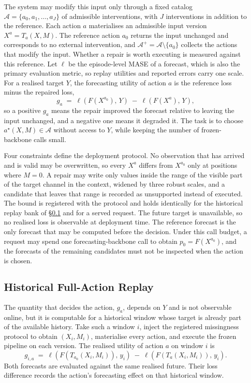 \documentclass{article}
\newcommand{\calA}{\mathcal{A}}
\newcommand{\loss}{\ell}
\begin{document}
The system may modify this input only through a fixed catalog
$\calA = \{a_0, a_1, \dots, a_J\}$ of admissible interventions, with
$J$ interventions in addition to the reference. Each action $a$ materialises an admissible
input version $X^{a} = T_a(X, M)$. The reference action $a_0$ returns the input unchanged and
corresponds to no external intervention, and $\calA^{+} = \calA \setminus \{a_0\}$ collects
the actions that modify the input. Whether a repair is worth executing is measured against
this reference. Let $\loss$ be the episode-level MASE of a forecast, which is also the primary evaluation
metric, so replay utilities and reported errors carry one scale. For a realised target
$Y$, the forecasting utility of action $a$ is the reference loss minus the repaired loss,
\begin{equation}
  g_a \;=\; \loss\!\left(F(X^{a_0}),\, Y\right) \;-\; \loss\!\left(F(X^{a}),\, Y\right),
  \label{eq:utility}
\end{equation}
so a positive $g_a$ means the repair improved the forecast relative to leaving the input
unchanged, and a negative one means it degraded it. The task is to choose
$a^\star(X, M) \in \calA$ without access to $Y$, while keeping the
number of frozen-backbone calls small.

Four constraints define the deployment protocol. No observation that has arrived and is valid
may be overwritten, so every $X^{a}$ differs from $X^{a_0}$ only at positions where $M = 0$.
A repair may write only values inside the range of the visible part of the target channel in
the context, widened by three robust
scales, and a candidate that leaves that range is recorded as unsupported instead of executed.
The bound is registered with the protocol and holds identically for the historical replay bank
of \S\ref{sec:method-replay} and for a served
request. The future target is unavailable, so no realised loss is
observable at deployment time. The reference forecast is the only forecast that may be computed
before the decision. Under this call budget, a
request may spend one forecasting-backbone call to obtain $p_0 = F(X^{a_0})$, and the forecasts
of the remaining candidates must not be inspected when the action is chosen.

\subsection{Historical Full-Action Replay}
\label{sec:method-replay}
The quantity that decides the action, $g_a$, depends on $Y$ and is not observable online, but it
is computable for a historical window whose target is already part of the available history.
Take such a window $i$, inject the registered missingness protocol to obtain $(X_i, M_i)$,
materialise every action, and execute the frozen pipeline on each version. The realised utility
of action $a$ on window $i$ is
\begin{equation}
  g_{i,a} \;=\; \loss\!\left(F(T_{a_0}(X_i, M_i)),\, y_i\right)
  \;-\; \loss\!\left(F(T_{a}(X_i, M_i)),\, y_i\right).
  \label{eq:replay-gain}
\end{equation}
Both forecasts are evaluated against the same realised future. Their loss difference records
the action's forecasting effect on that historical window.
\end{document}
